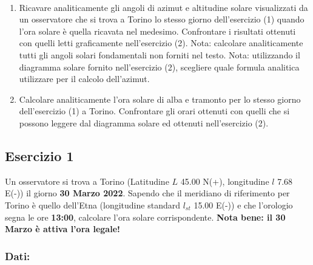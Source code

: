 \documentclass[11pt]{article}
\providecommand{\tightlist}{%
      \setlength{\itemsep}{0pt}\setlength{\parskip}{0pt}}
\begin{document}
            
    
    \begin{center}
    \end{center}
    { \hspace*{\fill} \\}
    

    \begin{enumerate}
\def\labelenumi{\arabic{enumi}.}
\setcounter{enumi}{2}
\tightlist
\item
  Ricavare analiticamente gli angoli di azimut e altitudine solare
  visualizzati da un osservatore che si trova a Torino lo stesso giorno
  dell'esercizio (1) quando l'ora solare è quella ricavata nel medesimo.
  Confrontare i risultati ottenuti con quelli letti graficamente
  nell'esercizio (2). Nota: calcolare analiticamente tutti gli angoli
  solari fondamentali non forniti nel testo. Nota: utilizzando il
  diagramma solare fornito nell'esercizio (2), scegliere quale formula
  analitica utilizzare per il calcolo dell'azimut.
\item
  Calcolare analiticamente l'ora solare di alba e tramonto per lo stesso
  giorno dell'esercizio (1) a Torino. Confrontare gli orari ottenuti con
  quelli che si possono leggere dal diagramma solare ed ottenuti
  nell'esercizio (2).
\end{enumerate}

    \newpage

    
    \hypertarget{esercizio-1}{%
\subsection{Esercizio 1}\label{esercizio-1}}

Un osservatore si trova a Torino (Latitudine \(L\) 45.00 N(+),
longitudine \(l\) 7.68 E(-)) il giorno \textbf{30 Marzo 2022}. Sapendo
che il meridiano di riferimento per Torino è quello dell'Etna
(longitudine standard \(l_{st}\) 15.00 E(-)) e che l'orologio segna le
ore \textbf{13:00}, calcolare l'ora solare corrispondente. \textbf{Nota
bene: il 30 Marzo è attiva l'ora legale!}

    \hypertarget{dati}{%
\subsubsection{Dati:}\label{dati}}
 
            
    
\end{document}
